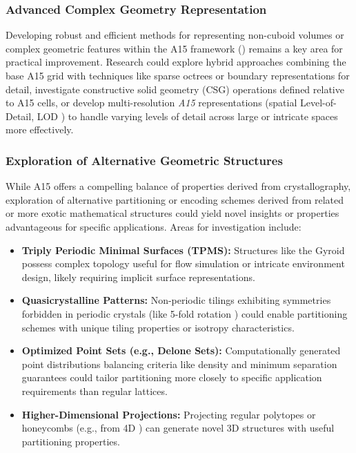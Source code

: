 \documentclass[10pt]{article}
\def\AAAB{\textit{A15}}
\begin{document}
\subsubsection{Advanced Complex Geometry Representation}\label{subsubsec:outlook-complex}
Developing robust and efficient methods for representing non-cuboid volumes or complex geometric features within the A15 framework () remains a key area for practical improvement. Research could explore hybrid approaches combining the base A15 grid with techniques like sparse octrees or boundary representations for detail, investigate constructive solid geometry (CSG) operations defined relative to A15 cells, or develop multi-resolution \AAAB{} representations (spatial Level-of-Detail, LOD \cite{Luebke2002}) to handle varying levels of detail across large or intricate spaces more effectively.

\subsubsection{Exploration of Alternative Geometric Structures}\label{subsubsec:outlook-geometry}
While A15 offers a compelling balance of properties derived from crystallography, exploration of alternative partitioning or encoding schemes derived from related or more exotic mathematical structures could yield novel insights or properties advantageous for specific applications. Areas for investigation include:
\begin{itemize} \itemsep0pt
    \item \textbf{Triply Periodic Minimal Surfaces (TPMS):} Structures like the Gyroid \cite{Schoen1970} possess complex topology useful for flow simulation or intricate environment design, likely requiring implicit surface representations.
    \item \textbf{Quasicrystalline Patterns:} Non-periodic tilings exhibiting symmetries forbidden in periodic crystals (like 5-fold rotation \cite{Shechtman1984}) could enable partitioning schemes with unique tiling properties or isotropy characteristics.
    \item \textbf{Optimized Point Sets (e.g., Delone Sets):} Computationally generated point distributions balancing criteria like density and minimum separation guarantees \cite{Gruber2007} could tailor partitioning more closely to specific application requirements than regular lattices.
    \item \textbf{Higher-Dimensional Projections:} Projecting regular polytopes or honeycombs (e.g., from 4D \cite{Coxeter1973}) can generate novel 3D structures with useful partitioning properties.
\end{itemize}
\end{document}
